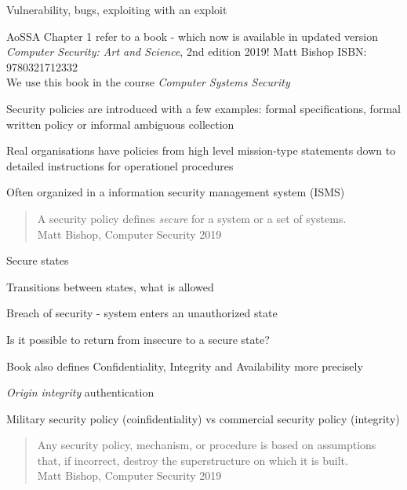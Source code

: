 \documentclass[Screen16to9,17pt]{foils}
\begin{document}

Vulnerability, bugs, exploiting with an exploit
\begin{list2}
\item AoSSA Chapter 1 refer to a book - which now is available in updated version\\
\emph{Computer Security: Art and Science}, 2nd edition 2019! Matt Bishop ISBN: 9780321712332\\
We use this book in the course \emph{Computer Systems Security}
\item Security policies are introduced with a few examples: formal specifications, formal written policy or informal ambiguous collection
\item Real organisations have policies from high level mission-type statements down to detailed instructions for operationel procedures
\item Often organized in a information security management system (ISMS)
\end{list2}


\begin{quote}
A security policy defines \emph{secure} for a system or a set of systems.\\
Matt Bishop, Computer Security 2019
\end{quote}

\begin{list1}
\item Secure states
\item Transitions between states, what is allowed
\item Breach of security - system enters an unauthorized state
\item Is it possible to return from insecure to a secure state?
\item Book also defines Confidentiality, Integrity and Availability more precisely
\item \emph{Origin integrity} authentication
\item Military security policy (coinfidentiality) vs commercial security policy (integrity)
\end{list1}


\begin{quote}
Any security policy, mechanism, or procedure is based on assumptions that, if incorrect, destroy the superstructure on which it is built.\\
Matt Bishop, Computer Security 2019
\end{quote}
\end{document}
